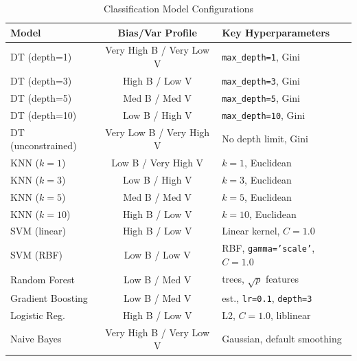 \documentclass[conference]{IEEEtran}
\begin{document}
\begin{table}[t]
    \caption{Classification Model Configurations}
    \label{tab:classifiers}
    \centering
    \small
    \renewcommand{\arraystretch}{1.3}
    \begin{tabular}{|>{\raggedright\arraybackslash}p{1.2in}|c|>{\raggedright\arraybackslash}p{1.2in}|}
    \hline
    \textbf{Model} & \textbf{Bias/Var Profile} & \textbf{Key Hyperparameters} \\
    \hline
    DT (depth=1)       & Very High B / Very Low V  & \texttt{max\_depth=1}, Gini \\
    \hline
    DT (depth=3)       & High B / Low V            & \texttt{max\_depth=3}, Gini \\
    \hline
    DT (depth=5)       & Med B / Med V             & \texttt{max\_depth=5}, Gini \\
    \hline
    DT (depth=10)      & Low B / High V            & \texttt{max\_depth=10}, Gini \\
    \hline
    DT (unconstrained) & Very Low B / Very High V  & No depth limit, Gini \\
    \hline
    KNN ($k=1$)        & Low B / Very High V       & $k=1$, Euclidean \\
    \hline
    KNN ($k=3$)        & Low B / High V            & $k=3$, Euclidean \\
    \hline
    KNN ($k=5$)        & Med B / Med V             & $k=5$, Euclidean \\
    \hline
    KNN ($k=10$)       & High B / Low V            & $k=10$, Euclidean \\
    \hline
    SVM (linear)       & High B / Low V            & Linear kernel, $C=1.0$ \\
    \hline
    SVM (RBF)          & Low B / Low V             & RBF, \texttt{gamma='scale'}, $C=1.0$ \\
    \hline
    Random Forest      & Low B / Med V             & 100 trees, $\sqrt{p}$ features \\
    \hline
    Gradient Boosting  & Low B / Med V             & 100 est., \texttt{lr=0.1}, \texttt{depth=3} \\
    \hline
    Logistic Reg.      & High B / Low V            & L2, $C=1.0$, liblinear \\
    \hline
    Naive Bayes        & Very High B / Very Low V  & Gaussian, default smoothing \\
    \hline
    \end{tabular}
\end{table}
\end{document}
